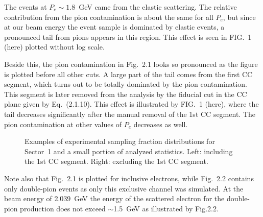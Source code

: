 \documentclass[,superscriptaddress,showpacs,amssymb,amsmath,amsfonts,linenumbers,article]{revtex4-1}
\begin{document}
\begin{enumerate}[label=\textbf{\arabic*}.]
The events at $P_{e} \sim 1.8$~GeV came from the elastic scattering. The relative contribution from the pion contamination is about the same for all $P_{e}$, but since at our beam energy the event sample is dominated by elastic events, a pronounced tail from pions appears in this region. This effect is seen in FIG.~1 (here) plotted without log scale.



Beside this, the pion contamination in Fig.~2.1 looks so pronounced as the figure is plotted before all other cuts. A large part of the tail comes from the first CC segment, which turns out to be totally dominated by the pion contamination. This segment is later removed from the analysis by the fiducial cut in the CC plane given by Eq.~(2.1.10). This effect is illustrated by FIG.~1 (here), where the tail decreases significantly after the manual removal of the 1st CC segment. The pion contamination at other values of $P_{e}$ decreases as well.


\begin{figure}[htp]
\begin{center}
\caption{\small  Examples of experimental sampling fraction distributions for Sector~1 and a small portion of analyzed statistics. Left: including the 1st CC segment. Right: excluding the 1st CC segment.} \label{fig:cc_plane_def}
\end{center}
\end{figure}


Note also that Fig.~2.1 is plotted for inclusive electrons, while Fig.~2.2 contains only double-pion events as only this exclusive channel was simulated. At the beam energy of 2.039~GeV the energy of the scattered electron for the double-pion production does not exceed $\sim$1.5~GeV as illustrated by Fig.2.2.


\end{enumerate}
\end{document}

